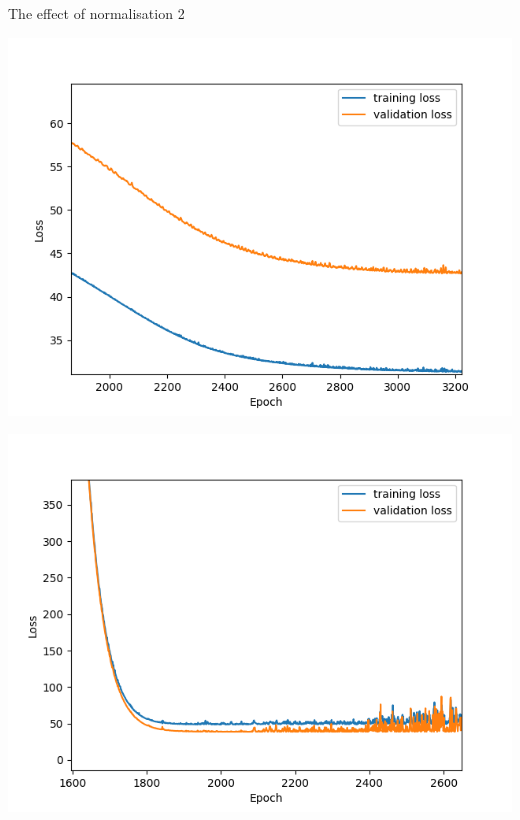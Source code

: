 \documentclass{beamer}
\begin{document}
\begin{frame}{The effect of normalisation 2}
\centering
\begin{minipage}{0.48\textwidth}
	\includegraphics[width=\textwidth]{Figure_4.png}
	\label{historyNormalised2}
\end{minipage}
\begin{minipage}{0.48\textwidth}
	\includegraphics[width=\textwidth]{History_subplot_3.png}
	\label{historyNonNormalised2}
\end{minipage}

\end{frame}
\end{document}
